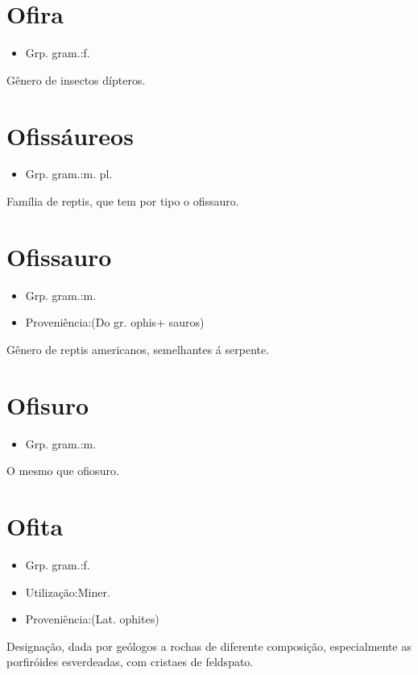 \section{Ofira}
\begin{itemize}
\item {Grp. gram.:f.}
\end{itemize}
Gênero de insectos dípteros.
\section{Ofissáureos}
\begin{itemize}
\item {Grp. gram.:m. pl.}
\end{itemize}
Família de reptis, que tem por tipo o ofissauro.
\section{Ofissauro}
\begin{itemize}
\item {Grp. gram.:m.}
\end{itemize}
\begin{itemize}
\item {Proveniência:(Do gr. \textunderscore ophis\textunderscore  + \textunderscore sauros\textunderscore )}
\end{itemize}
Gênero de reptis americanos, semelhantes á serpente.
\section{Ofisuro}
\begin{itemize}
\item {Grp. gram.:m.}
\end{itemize}
O mesmo que \textunderscore ofiosuro\textunderscore .
\section{Ofita}
\begin{itemize}
\item {Grp. gram.:f.}
\end{itemize}
\begin{itemize}
\item {Utilização:Miner.}
\end{itemize}
\begin{itemize}
\item {Proveniência:(Lat. \textunderscore ophites\textunderscore )}
\end{itemize}
Designação, dada por geólogos a rochas de diferente composição, especialmente as porfiróides esverdeadas, com cristaes de feldspato.
